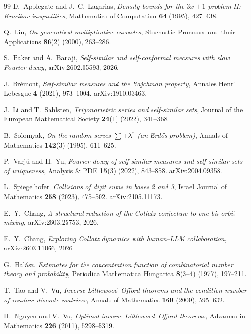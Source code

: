 \documentclass[11pt]{article}
\theoremstyle{definition}
\theoremstyle{remark}
\begin{document}
\begin{thebibliography}{99}
 D.\ Applegate and J.\ C.\ Lagarias,
  \emph{Density bounds for the $3x+1$ problem II: Krasikov
  inequalities}, Mathematics of Computation \textbf{64} (1995),
  427--438.

 Q.\ Liu, \emph{On generalized multiplicative
  cascades}, Stochastic Processes and their Applications
  \textbf{86}(2) (2000), 263--286.

 S.\ Baker and A.\ Banaji, \emph{Self-similar
  and self-conformal measures with slow Fourier decay},
  arXiv:2602.05593, 2026.

 J.\ Br\'emont, \emph{Self-similar measures and the
  Rajchman property}, Annales Henri Lebesgue \textbf{4} (2021),
  973--1004. arXiv:1910.03463.

 J.\ Li and T.\ Sahlsten, \emph{Trigonometric
  series and self-similar sets}, Journal of the European Mathematical
  Society \textbf{24}(1) (2022), 341--368.

 B.\ Solomyak, \emph{On the random series
  $\sum\pm\lambda^n$ (an Erd\H{o}s problem)}, Annals of Mathematics
  \textbf{142}(3) (1995), 611--625.

 P.\ Varj\'u and H.\ Yu, \emph{Fourier decay of
  self-similar measures and self-similar sets of uniqueness}, Analysis
  \& PDE \textbf{15}(3) (2022), 843--858. arXiv:2004.09358.

 L.\ Spiegelhofer, \emph{Collisions of digit
  sums in bases 2 and 3}, Israel Journal of Mathematics \textbf{258}
  (2023), 475--502. arXiv:2105.11173.

 E.\ Y.\ Chang, \emph{A structural reduction of the
  Collatz conjecture to one-bit orbit mixing}, arXiv:2603.25753, 2026.

 E.\ Y.\ Chang, \emph{Exploring Collatz
  dynamics with human--LLM collaboration}, arXiv:2603.11066, 2026.

 G.\ Hal\'asz, \emph{Estimates for the
  concentration function of combinatorial number theory and
  probability}, Periodica Mathematica Hungarica \textbf{8}(3--4)
  (1977), 197--211.

 T.\ Tao and V.\ Vu, \emph{Inverse Littlewood--Offord
  theorems and the condition number of random discrete matrices},
  Annals of Mathematics \textbf{169} (2009), 595--632.

 H.\ Nguyen and V.\ Vu, \emph{Optimal inverse
  Littlewood--Offord theorems}, Advances in Mathematics \textbf{226}
  (2011), 5298--5319.


\end{thebibliography}
\end{document}
